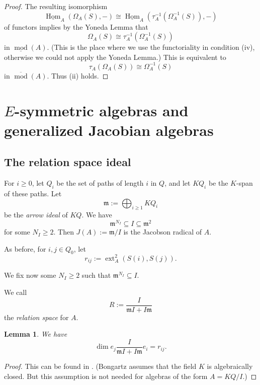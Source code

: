 \documentclass[12pt,reqno]{amsart}
\newtheorem{Lem}[Thm]{Lemma}
\theoremstyle{definition}
\newcommand{\m}{\mathfrak{m}}
\newcommand{\md}{\operatorname{mod}}
\newcommand{\Hom}{\operatorname{Hom}}
\newcommand{\ext}{\operatorname{ext}}
\begin{document}
\begin{proof}
The resulting isomorphism 
$$
\underline{\Hom}_A(\Omega_A(S),-) \cong \underline{\Hom}_A(\tau_A^{-1}(\Omega_A^{-1}(S)),-)
$$
of functors
implies by the Yoneda Lemma that 
$$
\Omega_A(S) \cong \tau_A^{-1}(\Omega_A^{-1}(S))
$$ in $\underline{\md}(A)$.
(This is the place where we use the functoriality in condition (iv), otherwise we could not apply the Yoneda Lemma.)
This is equivalent to 
$$
\tau_A(\Omega_A(S)) \cong \Omega_A^{-1}(S)
$$ in $\overline{\md}(A)$.
Thus (ii) holds.
\end{proof}


\section{$E$-symmetric algebras and generalized 
Jacobian algebras}\label{sec:4}


\subsection{The relation space ideal}
\label{subsec:9}
For $i \ge 0$, let $Q_i$ be the set of paths of length $i$ in $Q$,
and let $KQ_i$ be the $K$-span of these paths.
 Let
$$
\m := \bigoplus_{i \ge 1} KQ_i 
$$
be the \emph{arrow ideal} of $KQ$.
We have
$$
\m^{N_I} \subseteq I \subseteq \m^2
$$
for some $N_I \ge 2$.
Then $J(A) := \m/I$ is the Jacobson radical of $A$.

As before, 
for $i,j \in Q_0$, let
$$
r_{ij} := \ext_A^2(S(i),S(j)).
$$

We fix now some
$N_I \ge 2$ such that $\m^{N_I} \subseteq I$.

We call 
$$
R := \frac{I}{\m I+I\m}
$$
the \emph{relation space} for $A$.

\begin{Lem}\label{lem:truncation1}
We have
$$
\dim e_j\frac{I}{\m I+I\m}e_i = r_{ij}.
$$
\end{Lem}

\begin{proof}
This can be found in \cite[Section~1]{B83}.
(Bongartz assumes that the field $K$ is algebraically closed.
But this assumption is not needed for algebras of the form 
$A = KQ/I$.)
\end{proof}
\end{document}

